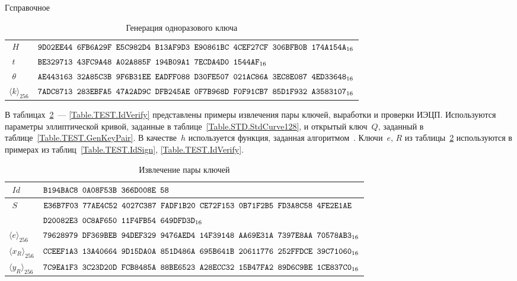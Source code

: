 \begin{appendix}{Г}{справочное}
\begin{table}[!h]
\caption{Генерация одноразового ключа}
\label{Table.TEST.GENK1}
{\small
\begin{tabular}{|l|l|}
%
\hline
$\phantom{\langle}H$ & 
$\texttt{9D02EE44~6FB6A29F~E5C982D4~B13AF9D3~E90861BC~4CEF27CF~306BFB0B~174A154A}_{16}$\\
%
\dhline
$\phantom{\langle}t$ & 
$\texttt{BE329713~43FC9A48~A02A885F~194B09A1~7ECDA4D0~1544AF}_{16}$\\
%
\hline
$\phantom{\langle}\theta$ & 
$\texttt{AE443163~32A85C3B~9F6B31EE~EADFF088~D30FE507~021AC86A~3EC8E087~4ED33648}_{16}$\\
%
\dhline
$\langle k\rangle_{256}$ & 
%
$\texttt{7ADC8713~283EBFA5~47A2AD9C~DFB245AE~0F7B968D~F0F91CB7~85D1F932~A3583107}_{16}$\\
\hline
\end{tabular}
}
\end{table}

\label{TEST.IBS}

В таблицах~\ref{Table.TEST.IdExtract}~--- \ref{Table.TEST.IdVerify} 
представлены примеры извлечения пары ключей, выработки и проверки 
ИЭЦП.
%
Используются параметры эллиптической кривой, 
заданные в таблице~\ref{Table.STD.StdCurve128},
и открытый ключ~$Q$, 
заданный в таблице~\ref{Table.TEST.GenKeyPair}.
%
В качестве~$h$ используется функция,
заданная алгоритмом~.
%
Ключи~$e$, $R$ из таблицы~\ref{Table.TEST.IdExtract}
используются в примерах из таблиц~\ref{Table.TEST.IdSign}, 
\ref{Table.TEST.IdVerify}.

\begin{table}[!h]
\caption{Извлечение пары ключей}\label{Table.TEST.IdExtract}
{\small
\begin{tabular}{|l|l|}
\hline
$\phantom{\langle}Id$ & 
$\texttt{B194BAC8~0A08F53B~366D008E~58}$\\
%
\hline
$\phantom{\langle}S$ & 
$\texttt{E36B7F03~77AE4C52~4027C387~FADF1B20~CE72F153~0B71F2B5~FD3A8C58~4FE2E1AE}$\\
& 
$\texttt{D20082E3~0C8AF650~11F4FB54~649DFD3D}_{16}$\\
%
\dhline
$\langle e\rangle_{256}$ & 
$\texttt{79628979~DF369BEB~94DEF329~9476AED4~14F39148~AA69E31A~7397E8AA~70578AB3}_{16}$\\
%
\hline
$\langle x_R\rangle_{256}$ & 
$\texttt{CCEEF1A3~13A40664~9D15DA0A~851D486A~695B641B~20611776~252FFDCE~39C71060}_{16}$\\
%
\hline
$\langle y_R\rangle_{256}$ & 
$\texttt{7C9EA1F3~3C23D20D~FCB8485A~88BE6523~A28ECC32~15B47FA2~89D6C9BE~1CE837C0}_{16}$\\
\hline
\end{tabular}
}
\end{table}


\end{appendix}
